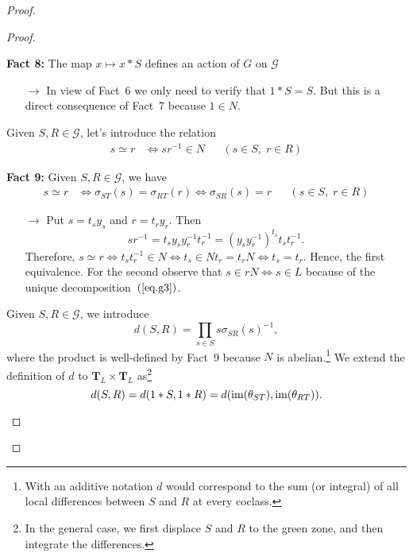 \begin{solution}
\begin{proof}
\begin{proof}
\begin{enumerate}[\rm a)]
    \textbf{Fact 8:} The map $x\mapsto x\ast S$ defines an action of $G$ on $\mathcal G$
    
    {\small
    \begin{enumerate}
        \item[$\to$]
        In view of Fact~6 we only need to verify that $1\ast S=S$. But this is a direct consequence of Fact~7 because $1\in N$.
    \end{enumerate}
    }
    
    \medskip
    
    Given $S,R\in\mathcal G$, let's introduce the relation
    \begin{align*}
        s\simeq r&\iff sr^{-1}\in N    &&(s\in S,\;r\in R)
    \end{align*}
    
    \medskip
    
    \textbf{Fact 9:} Given $S, R\in\mathcal G$, we have
        \begin{align*}
            s\simeq r&\iff\sigma_{ST}(s)=\sigma_{RT}(r)\iff\sigma_{SR}(s)=r &&(s\in S,\;r\in R)
        \end{align*}
    {\small
    \begin{enumerate}
        \item[$\to$]
        Put $s=t_sy_s$ and $r=t_ry_r$. Then
        $$
            sr^{-1} = t_sy_sy_r^{-1}t_r^{-1} = (y_sy_r^{-1})^{t_s}t_st_r^{-1}.
        $$
        Therefore, $s\simeq r\iff t_st_r^{-1}\in N\iff t_s\in Nt_r=t_rN\iff t_s=t_r$. Hence, the first equivalence. For the second observe that $s\in rN\iff s\in L$ because of the unique decomposition~$(\ref{eq.g3})$.
    \end{enumerate}
    }

    \medskip
    
    Given $S,R\in\mathcal G$, we introduce
    $$
        d(S,R) = \prod_{s\in S}s\sigma_{SR}(s)^{-1},
    $$
    where the product is well-defined by Fact~9 because $N$ is abelian.\footnote{With an additive notation $d$ would correspond to the sum (or integral) of all local differences between $S$ and $R$ at every coclass.} We extend the definition of $d$ to $\mathbf T_L\times\mathbf T_L$ as\footnote{In the general case, we first displace $S$ and $R$ to the green zone, and then integrate the differences.}
    $$
        d(S,R) = d(1\ast S,1\ast R)
            = d(\operatorname{im}(\theta_{ST}),\operatorname{im}(\theta_{RT})).
    $$


\end{enumerate}
\end{proof}
\end{proof}
\end{solution}
